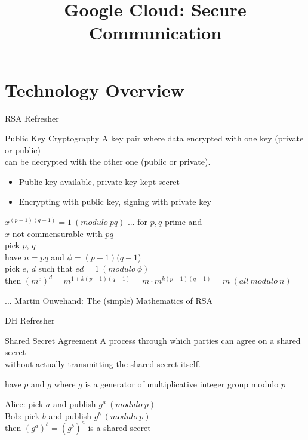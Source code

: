 \RequirePackage{slides-shared}
\title{Google Cloud: Secure Communication}



\makepreamble


\section{Technology Overview}


\begin{frame}{RSA Refresher}
    \begin{block}{Public Key Cryptography}
        A key pair where data encrypted with one key (private or public) \\
        can be decrypted with the other one (public or private).
        \begin{itemize}
            \item Public key available, private key kept secret
            \item Encrypting with public key, signing with private key
        \end{itemize}
    \end{block}

    \bigskip

    $x^{(p-1)(q-1)} = 1 ~ (modulo ~ pq)$ \hfill ... for $p, q$ prime and \\ \hfill $x$ not commensurable with $pq$ \\
    pick $p$, $q$ \\
    have $n = pq$ and $\phi = (p-1)(q-1$) \\
    pick $e$, $d$ such that $ed = 1 ~ (modulo ~ \phi)$ \\
    then $(m^e)^d = m^{1+k(p-1)(q-1)} = m \cdot m^{k(p-1)(q-1)} = m ~ (all ~ modulo ~ n)$ \\

    \bigskip

    \hfill ... Martin Ouwehand: The (simple) Mathematics of RSA
\end{frame}


\begin{frame}{DH Refresher}
    \begin{block}{Shared Secret Agreement}
        A process through which parties can agree on a shared secret \\
        without actually transmitting the shared secret itself.
    \end{block}

    \bigskip

    have $p$ and $g$ where $g$ is a generator of multiplicative integer group modulo $p$ \\

    \bigskip

    Alice: pick $a$ and publish $g^a ~ (modulo ~ p)$ \\
    Bob: pick $b$ and publish $g^b ~ (modulo ~ p)$ \\

    then $(g^a)^b = (g^b)^a$ is a shared secret \\

\end{frame}


